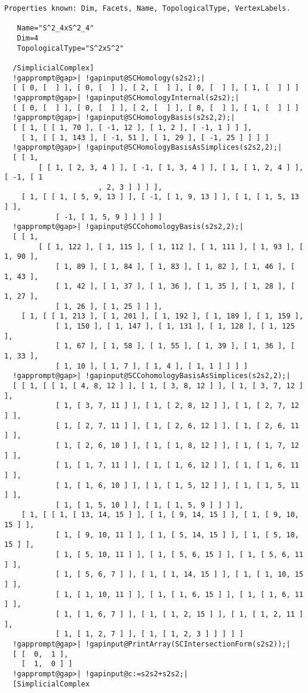 \documentclass[a4paper,11pt]{report}
\begin{document}
{{\begin{Verbatim}[commandchars=!@|,fontsize=\small,frame=single,label=Example]
   Properties known: Dim, Facets, Name, TopologicalType, VertexLabels.
  
   Name="S^2_4xS^2_4"
   Dim=4
   TopologicalType="S^2xS^2"
  
  /SimplicialComplex]
  !gapprompt@gap>| !gapinput@SCHomology(s2s2);|
  [ [ 0, [  ] ], [ 0, [  ] ], [ 2, [  ] ], [ 0, [  ] ], [ 1, [  ] ] ]
  !gapprompt@gap>| !gapinput@SCHomologyInternal(s2s2);|
  [ [ 0, [  ] ], [ 0, [  ] ], [ 2, [  ] ], [ 0, [  ] ], [ 1, [  ] ] ]
  !gapprompt@gap>| !gapinput@SCHomologyBasis(s2s2,2);|
  [ [ 1, [ [ 1, 70 ], [ -1, 12 ], [ 1, 2 ], [ -1, 1 ] ] ], 
    [ 1, [ [ 1, 143 ], [ -1, 51 ], [ 1, 29 ], [ -1, 25 ] ] ] ]
  !gapprompt@gap>| !gapinput@SCHomologyBasisAsSimplices(s2s2,2);|
  [ [ 1, 
        [ [ 1, [ 2, 3, 4 ] ], [ -1, [ 1, 3, 4 ] ], [ 1, [ 1, 2, 4 ] ], [ -1, [ 1
                      , 2, 3 ] ] ] ], 
    [ 1, [ [ 1, [ 5, 9, 13 ] ], [ -1, [ 1, 9, 13 ] ], [ 1, [ 1, 5, 13 ] ], 
            [ -1, [ 1, 5, 9 ] ] ] ] ]
  !gapprompt@gap>| !gapinput@SCCohomologyBasis(s2s2,2);|
  [ [ 1, 
        [ [ 1, 122 ], [ 1, 115 ], [ 1, 112 ], [ 1, 111 ], [ 1, 93 ], [ 1, 90 ], 
            [ 1, 89 ], [ 1, 84 ], [ 1, 83 ], [ 1, 82 ], [ 1, 46 ], [ 1, 43 ], 
            [ 1, 42 ], [ 1, 37 ], [ 1, 36 ], [ 1, 35 ], [ 1, 28 ], [ 1, 27 ], 
            [ 1, 26 ], [ 1, 25 ] ] ], 
    [ 1, [ [ 1, 213 ], [ 1, 201 ], [ 1, 192 ], [ 1, 189 ], [ 1, 159 ], 
            [ 1, 150 ], [ 1, 147 ], [ 1, 131 ], [ 1, 128 ], [ 1, 125 ], 
            [ 1, 67 ], [ 1, 58 ], [ 1, 55 ], [ 1, 39 ], [ 1, 36 ], [ 1, 33 ], 
            [ 1, 10 ], [ 1, 7 ], [ 1, 4 ], [ 1, 1 ] ] ] ]
  !gapprompt@gap>| !gapinput@SCCohomologyBasisAsSimplices(s2s2,2);|
  [ [ 1, [ [ 1, [ 4, 8, 12 ] ], [ 1, [ 3, 8, 12 ] ], [ 1, [ 3, 7, 12 ] ], 
            [ 1, [ 3, 7, 11 ] ], [ 1, [ 2, 8, 12 ] ], [ 1, [ 2, 7, 12 ] ], 
            [ 1, [ 2, 7, 11 ] ], [ 1, [ 2, 6, 12 ] ], [ 1, [ 2, 6, 11 ] ], 
            [ 1, [ 2, 6, 10 ] ], [ 1, [ 1, 8, 12 ] ], [ 1, [ 1, 7, 12 ] ], 
            [ 1, [ 1, 7, 11 ] ], [ 1, [ 1, 6, 12 ] ], [ 1, [ 1, 6, 11 ] ], 
            [ 1, [ 1, 6, 10 ] ], [ 1, [ 1, 5, 12 ] ], [ 1, [ 1, 5, 11 ] ], 
            [ 1, [ 1, 5, 10 ] ], [ 1, [ 1, 5, 9 ] ] ] ], 
    [ 1, [ [ 1, [ 13, 14, 15 ] ], [ 1, [ 9, 14, 15 ] ], [ 1, [ 9, 10, 15 ] ], 
            [ 1, [ 9, 10, 11 ] ], [ 1, [ 5, 14, 15 ] ], [ 1, [ 5, 10, 15 ] ], 
            [ 1, [ 5, 10, 11 ] ], [ 1, [ 5, 6, 15 ] ], [ 1, [ 5, 6, 11 ] ], 
            [ 1, [ 5, 6, 7 ] ], [ 1, [ 1, 14, 15 ] ], [ 1, [ 1, 10, 15 ] ], 
            [ 1, [ 1, 10, 11 ] ], [ 1, [ 1, 6, 15 ] ], [ 1, [ 1, 6, 11 ] ], 
            [ 1, [ 1, 6, 7 ] ], [ 1, [ 1, 2, 15 ] ], [ 1, [ 1, 2, 11 ] ], 
            [ 1, [ 1, 2, 7 ] ], [ 1, [ 1, 2, 3 ] ] ] ] ]
  !gapprompt@gap>| !gapinput@PrintArray(SCIntersectionForm(s2s2));|
  [ [  0,  1 ],
    [  1,  0 ] ]
  !gapprompt@gap>| !gapinput@c:=s2s2+s2s2;|
  [SimplicialComplex
  

\end{Verbatim}}}
\end{document}
